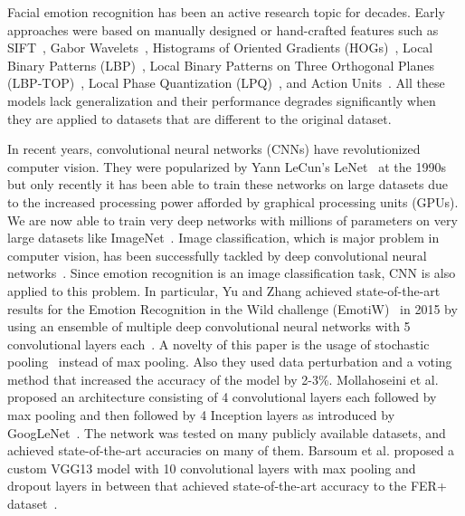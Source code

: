 Facial emotion recognition has been an active research topic for decades. Early approaches were based on manually designed or hand-crafted features such as SIFT~\cite{berretti2010set}, Gabor Wavelets~\cite{zhang1999feature}, Histograms of Oriented Gradients (HOGs)~\cite{deniz2011face}, Local Binary Patterns (LBP)~\cite{shan2009facial}, Local Binary Patterns on Three Orthogonal Planes (LBP-TOP)~\cite{zhao2007dynamic}, Local Phase Quantization (LPQ)~\cite{wang2012facial}, and Action Units~\cite{tian2001recognizing}. All these models lack generalization and their performance degrades significantly when they are applied to datasets that are different to the original dataset.

In recent years, convolutional neural networks (CNNs) have revolutionized computer vision. They were popularized by Yann LeCun's LeNet~\cite{lecun1990handwritten} at the 1990s but only recently it has been able to train these networks on large datasets due to the increased processing power afforded by graphical processing units (GPUs). We are now able to train very deep networks with millions of parameters on very large datasets like ImageNet~\cite{deng2009imagenet}. Image classification, which is major problem in computer vision, has been successfully tackled by deep convolutional neural networks~\cite{krizhevsky2012imagenet,szegedy2015going}. Since emotion recognition is an image classification task, CNN is also applied to this problem. In particular, Yu and Zhang achieved state-of-the-art results for the Emotion Recognition in the Wild challenge (EmotiW)~\cite{dhall2014emotion} in 2015 by using an ensemble of multiple deep convolutional neural networks with 5 convolutional layers each~\cite{yu2015image}. A novelty of this paper is the usage of stochastic pooling~\cite{zeiler2013stochastic} instead of max pooling. Also they used data perturbation and a voting method that increased the accuracy of the model by 2-3\%. Mollahoseini et al.~\cite{mollahosseini2016going} proposed an architecture consisting of 4 convolutional layers each followed by max pooling and then followed by 4 Inception layers as introduced by GoogLeNet~\cite{szegedy2015going}. The network was tested on many publicly available datasets, and achieved state-of-the-art accuracies on many of them. Barsoum et al. proposed a custom VGG13 model with 10 convolutional layers with max pooling and dropout layers in between that achieved state-of-the-art accuracy to the FER+ dataset~\cite{barsoum2016training}. 

